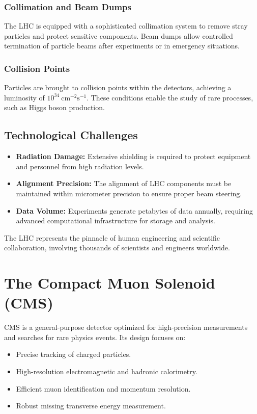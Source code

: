 \subsubsection{Collimation and Beam Dumps}
The LHC is equipped with a sophisticated collimation system to remove stray particles and protect sensitive components. Beam dumps allow controlled termination of particle beams after experiments or in emergency situations.

\subsubsection{Collision Points}
Particles are brought to collision points within the detectors, achieving a luminosity of $10^{34}~\mathrm{cm^{-2}s^{-1}}$. These conditions enable the study of rare processes, such as Higgs boson production.

\subsection{Technological Challenges}
\begin{itemize}
\item \textbf{Radiation Damage:} Extensive shielding is required to protect equipment and personnel from high radiation levels.
\item \textbf{Alignment Precision:} The alignment of LHC components must be maintained within micrometer precision to ensure proper beam steering.
\item \textbf{Data Volume:} Experiments generate petabytes of data annually, requiring advanced computational infrastructure for storage and analysis.
\end{itemize}

The LHC represents the pinnacle of human engineering and scientific collaboration, involving thousands of scientists and engineers worldwide.

\section{The Compact Muon Solenoid (CMS)}
CMS is a general-purpose detector optimized for high-precision measurements and searches for rare physics events. Its design focuses on:
\begin{itemize}
\item Precise tracking of charged particles.
\item High-resolution electromagnetic and hadronic calorimetry.
\item Efficient muon identification and momentum resolution.
\item Robust missing transverse energy measurement.
\end{itemize}

